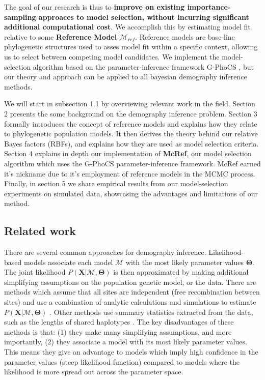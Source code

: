 \documentclass[11pt]{article}
\newcommand{\vect}[1]{\boldsymbol{\mathbf{#1}}}
\newcommand{\X}{\vect{X}}
\newcommand{\M}{\mathcal{M}}
\newcommand{\T}{\vect{\Theta}}
\newcommand{\Mref}{\M_{ref}}
\newcommand{\1}{\mathbbm{1}}
\newcommand{\gp}{G-PhoCS }
\begin{document}
The goal of our research is thus to \textbf{improve on existing importance-sampling approaces to model selection, without incurring significant additional computational cost}.
%
We accomplish this by estimating model fit relative to some \textbf{Reference Model $\Mref$}. Reference models are base-line phylogenetic structures used to asses model fit within a specific context, allowing us to select between competing model candidates.
%
We implement the model-selection algorithm based on the parameter-inference framework \gp, but our theory and approach can be applied to all bayesian demography inference methods.

We will start in subsection 1.1 by overviewing relevant work in the field.
%
Section 2 presents the some background on the demography inference problem.
%
Section 3 formally introduces the concept of reference models and explains how they relate to phylogenetic population models. It then derives the theory behind our relative Bayes factors (RBFs), and explains how they are used as model selection criteria. 
%
Section 4 explains in depth our implementation of \textbf{McRef}, our model selection algorithm which uses the \gp parameter-inference framework. McRef earned it's nickname due to it's employment of reference models in the MCMC process.
%
Finally, in section 5 we share empirical results from our model-selection experiments on simulated data, showcasing the advantages and limitations of our method.

\subsection{Related work}

There are several common approaches for demography inference. 
%
Likelihood-based models associate each model $\M$ with the most likely parameter values $\T$.
%
The joint likelihood $P(\X|\M,\T)$ is then approximated by making additional simplifying assumptions on the population genetic model, or the data.
%
There are methods which assume that all sites are independent (free recombination between sites) and use a combination of analytic calculations and simulations to estimate $P(\X|\M,\T)$ \citep{GUTEETAL09,KAMMETAL17,KAMMETAL18}. 
%
Other methods use summary statistics extracted from the data, such as the lengths of shared haplotypes \citep{HARRNIEL13,BROWBROW15}. 
%
The key disadvantages of these methods is that: (1) they make many simplifying assumptions, and more importantly, (2) they associate a model with its most likely parameter values. 
%
This means they give an advantage to models which imply high confidence in the parameter values (steep likelihood function) compared to models where the likelihood is more spread out across the parameter space.
\end{document}
